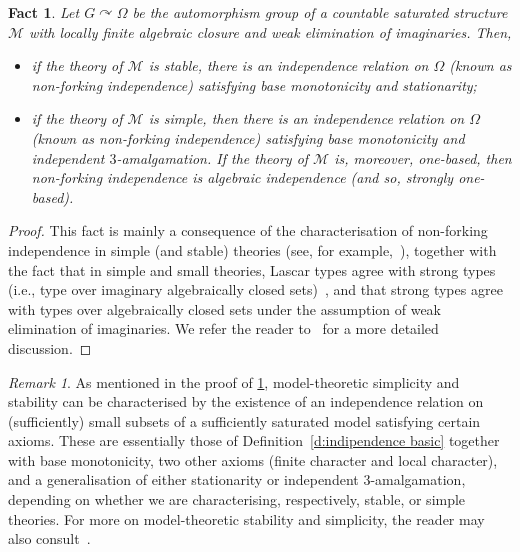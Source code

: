 \documentclass{article}
\newtheorem{fact}[theorem]{Fact}
\theoremstyle{remark}
\newtheorem{remark}[theorem]{Remark}
\theoremstyle{definition}
\def\acts{\curvearrowright}
\newcommand{\M}[0]{\mathcal{M}}
\begin{document}
{{{{{\begin{fact}\label{fact:modeltheoretic properties} Let $G\acts\Omega$ be the automorphism group of a countable saturated structure $\M$ with locally finite algebraic closure and weak elimination of imaginaries. Then, 
\begin{itemize}
    \item if the theory of  $\M$ is stable, there is an independence relation on $\Omega$ (known as non-forking independence) satisfying base monotonicity and stationarity;
     \item if the theory of $\M$ is simple, then there is an independence relation on $\Omega$ (known as non-forking independence) satisfying base monotonicity and independent $3$-amalgamation.  If the theory of $\mathcal{M}$ is, moreover, one-based, then non-forking independence is algebraic independence (and so, strongly one-based). 
\end{itemize} 
\end{fact}
\begin{proof} This fact is mainly a consequence of the characterisation of non-forking independence in simple (and stable) theories (see, for example,~\cite[Section 3]{kim2013simplicity}), together with the fact that in simple and small theories, Lascar types agree with strong types (i.e., type over imaginary algebraically closed sets)~\cite[Proposition 2.1.19(2) and Corollary 5.3.5]{kim2013simplicity}, and that strong types agree with types {over algebraically closed sets} under the assumption of weak elimination of imaginaries. We refer the reader to~\cite[Section 3C]{ghaddln24} for a more detailed discussion. 
\end{proof}

\begin{remark}\label{rem:independenceaxioms}
As mentioned in the proof of \cref{fact:modeltheoretic properties}, model-theoretic simplicity and stability can be characterised by the existence of an independence relation on (sufficiently) small subsets of a sufficiently saturated model satisfying  certain axioms. These are essentially those of Definition~\ref{d:indipendence basic} together with base monotonicity, two other axioms (finite character and local character), and a generalisation of either stationarity or independent $3$-amalgamation, depending on whether we are characterising, respectively, stable, or simple theories. For more on model-theoretic stability and simplicity, the reader may also consult~\cite{pillay1996geometric, baldwin2017fundamentals, kim2013simplicity}. 
\end{remark}







}}}}}
\end{document}
